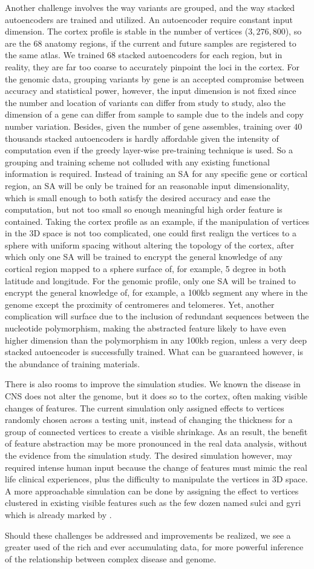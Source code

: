 Another challenge involves the way variants are grouped, and the way stacked autoencoders are trained and utilized. An autoencoder require constant input dimension. The cortex profile is stable in the number of vertices ($3,276,800$), so are the 68 anatomy regions, if the current and future samples are registered to the same atlas. We trained 68 stacked autoencoders for each region, but in reality, they are far too coarse to accurately pinpoint the loci in the cortex. For the genomic data, grouping variants by gene is an accepted compromise between accuracy and statistical power, however, the input dimension is not fixed since the number and location of variants can differ from study to study, also the dimension of a gene can differ from sample to sample due to the indels and copy number variation. Besides, given the number of gene assembles, training over $40$ thousands stacked autoencoders is hardly affordable given the intensity of computation even if the greedy layer-wise pre-training technique is used. So a grouping and training scheme not colluded with any existing functional information is required. Instead of training an SA for any specific gene or cortical region, an SA will be only be trained for an reasonable input dimensionality, which is small enough to both satisfy the desired accuracy and ease the computation, but not too small so enough meaningful high order feature is contained. Taking the cortex profile as an example, if the manipulation of vertices in the 3D space is not too complicated, one could first realign the vertices to a sphere with uniform spacing without altering the topology of the cortex, after which only one SA will be trained to encrypt the general knowledge of any cortical region mapped to a sphere surface of, for example, 5 degree in both latitude and longitude. For the genomic profile, only one SA will be trained to encrypt the general knowledge of, for example, a 100kb segment any where in the genome except the proximity of centromeres and telomeres. Yet, another complication will surface due to the inclusion of redundant sequences between the nucleotide polymorphism, making the abstracted feature likely to have even higher dimension than the polymorphism in any 100kb region, unless a very deep stacked autoencoder is successfully trained. What can be guaranteed however, is the abundance of training materials.

There is also rooms to improve the simulation studies. We known the disease in CNS does not alter the genome, but it does so to the cortex, often making visible changes of features. The current simulation only assigned effects to vertices randomly chosen across a testing unit, instead of changing the thickness for a group of connected vertices to create a visible shrinkage. As an result, the benefit of feature abstraction may be more pronounced in the real data analysis, without the evidence from the simulation study. The desired simulation however, may required intense human input because the change of features must mimic the real life clinical experiences, plus the difficulty to manipulate the vertices in 3D space. A more approachable simulation can be done by assigning the effect to vertices clustered in existing visible features such as the few dozen named sulci and gyri which is already marked by \FS.

Should these challenges be addressed and improvements be realized, we see a greater used of the rich and ever accumulating data, for more powerful inference of the relationship between complex disease and genome.
